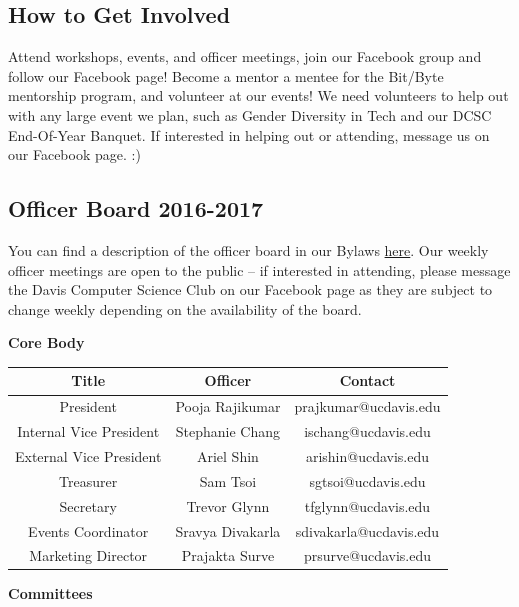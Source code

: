 \documentclass{article}
\begin{document}
\subsection {How to Get Involved}
\hspace{0.5cm} Attend workshops, events, and officer meetings, join our Facebook group and follow our Facebook page! Become a mentor a mentee for the Bit/Byte mentorship program, and volunteer at our events! We need volunteers to help out with any large event we plan, such as Gender Diversity in Tech and our DCSC End-Of-Year Banquet. If interested in helping out or attending, message us on our Facebook page. :)

\subsection{Officer Board 2016-2017}
\label{sec:officers}
\hspace{0.5cm} You can find a description of the officer board in our Bylaws  \href{https://github.com/DavisCSClub/Bylaws/blob/master/bylaws.pdf}{here}. Our weekly officer meetings are open to the public -- if interested in attending, please message the Davis Computer Science Club on our Facebook page as they are subject to change weekly depending on the availability of the board.
\\\begin{center}
\textbf{Core Body}
\end{center}
\begin{center}
\begin{tabular} {|c|c|c|}
\hline
\textbf{Title} & \textbf{Officer} & \textbf{Contact} \\
\hline
President & Pooja Rajikumar & prajkumar@ucdavis.edu \\
\hline
Internal Vice President & Stephanie Chang & ischang@ucdavis.edu \\
\hline
External Vice President & Ariel Shin & arishin@ucdavis.edu \\
\hline
Treasurer & Sam Tsoi & sgtsoi@ucdavis.edu\\
\hline
Secretary & Trevor Glynn & tfglynn@ucdavis.edu \\
\hline
Events Coordinator & Sravya Divakarla  & sdivakarla@ucdavis.edu\\
\hline
Marketing Director & Prajakta Surve & prsurve@ucdavis.edu\\
\hline
\end{tabular} 
\end{center}
\begin{center}
\textbf{Committees}
\end{center}
\end{document}
